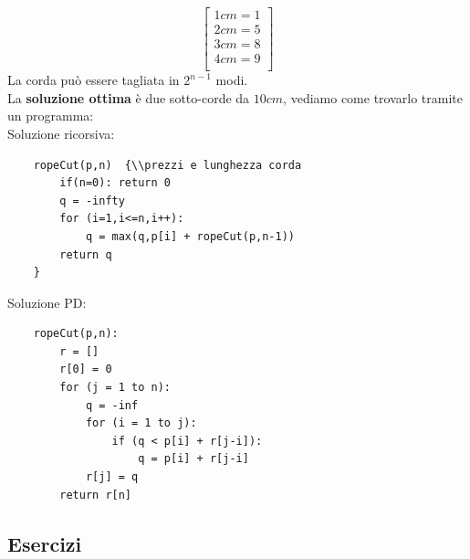\documentclass[a4paper,12pt]{article}
\begin{document}
\[
\begin{bmatrix}
    1cm = 1\\
    2cm = 5\\
    3cm = 8\\
    4cm = 9\\
\end{bmatrix}
\]
La corda può essere tagliata in $2^{n-1}$ modi.\\
La \textbf{soluzione ottima} è due sotto-corde da $10cm$, vediamo come trovarlo tramite un programma:\\
Soluzione ricorsiva:
\begin{lstlisting}
    ropeCut(p,n)  {\\prezzi e lunghezza corda
        if(n=0): return 0
        q = -infty
        for (i=1,i<=n,i++):
            q = max(q,p[i] + ropeCut(p,n-1))
        return q
    }
\end{lstlisting}
Soluzione PD:
\begin{lstlisting}
    ropeCut(p,n):
        r = []
        r[0] = 0
        for (j = 1 to n):
            q = -inf
            for (i = 1 to j):
                if (q < p[i] + r[j-i]):
                    q = p[i] + r[j-i]
            r[j] = q
        return r[n]
\end{lstlisting}
\subsection{Esercizi}
\end{document}
